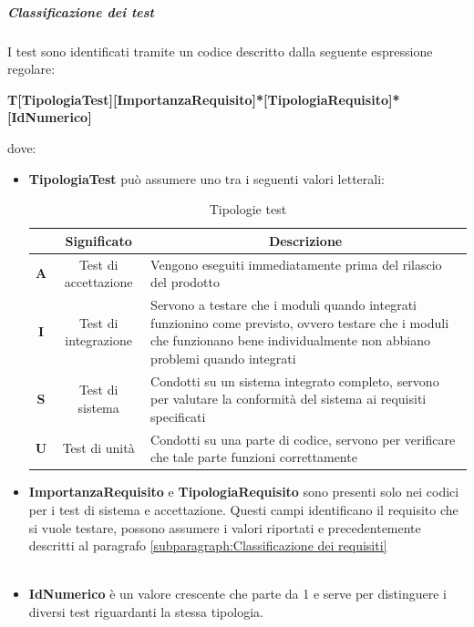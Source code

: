             \subparagraph{Classificazione dei test}
            I test sono identificati tramite un codice descritto dalla seguente espressione regolare:
            \begin{center}
                \large{\textbf{T[TipologiaTest][ImportanzaRequisito]*[TipologiaRequisito]*[IdNumerico]}}
            \end{center}
            dove:
            \begin{itemize}[label={}]
                \item \textbf{TipologiaTest} può assumere uno tra i seguenti valori letterali:
                \begin{table}[H]
                    \centering
                    \renewcommand{\arraystretch}{1.8}
                    \begin{tabular}{c|c|p{12cm}}
                        \rowcolor[HTML]{125E28} 
                        \multicolumn{1}{c}{\color[HTML]{FFFFFF}\textbf{Sigla}}
                        & \multicolumn{1}{c}{\color[HTML]{FFFFFF}\textbf{Significato}}
                        & \multicolumn{1}{c}{\color[HTML]{FFFFFF}\textbf{Descrizione}}\\
                        \hline
                        \textbf{A} & Test di accettazione & Vengono eseguiti immediatamente prima del rilascio del prodotto\\
                        \textbf{I} & Test di integrazione & Servono a testare che i moduli quando integrati funzionino come previsto, ovvero testare che i moduli che funzionano bene individualmente non abbiano problemi quando integrati\\
                        \textbf{S} & Test di sistema      & Condotti su un sistema integrato completo, servono per valutare la conformità del sistema ai requisiti specificati\\
                        \textbf{U} & Test di unità        & Condotti su una parte di codice, servono per verificare che tale parte funzioni correttamente\\
                    \end{tabular}
                    \caption{Tipologie test}
                \end{table}
                \item \textbf{ImportanzaRequisito} e \textbf{TipologiaRequisito} sono presenti solo nei codici per i test di sistema e accettazione. Questi campi identificano il requisito che si vuole testare, possono assumere i valori riportati e precedentemente descritti al paragrafo \ref{subparagraph:Classificazione dei requisiti}\\\\
                \item \textbf{IdNumerico} è un valore crescente che parte da 1 e serve per distinguere i diversi test riguardanti la stessa tipologia.
            \end{itemize}
    

